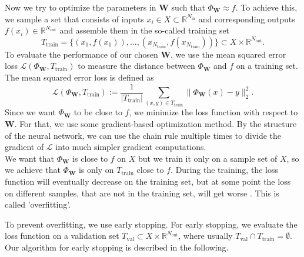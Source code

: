 Now we try to optimize the parameters in $\mathbf{W}$ such that $\Phi_\mathbf{W}\approx f$. To achieve this, we sample a set that consists of inputs $x_i\in X\subset\mathbb{R}^{N_{\mathrm{in}}}$ and corresponding outputs $f(x_i)\in\mathbb{R}^{N_{\mathrm{out}}}$ and assemble them in the so-called training set
\begin{equation}
T_\mathrm{train}=\{(x_1,f(x_1)),\dotsc,(x_{N_\mathrm{train}},f(x_{N_\mathrm{train}}))\}\subset X\times\mathbb{R}^{N_\mathrm{out}}.
\end{equation}
To evaluate the performance of our chosen $\mathbf{W}$, we use the mean squared error loss $\mathscr{L}(\Phi_\mathbf{W},T_\mathrm{train})$ to measure the distance between $\Phi_\mathbf{W}$ and $f$ on a training set. The mean squared error loss is defined as
\begin{displaymath}
\mathscr{L}(\Phi_\mathbf{W},T_\mathrm{train}):=\frac{1}{|T_\mathrm{train}|}\sum_{(x,y)\in T_\mathrm{train}}\| \Phi_\mathbf{W}(x)-y\|_2^2.
\end{displaymath}
Since we want $\Phi_\mathbf{W}$ to be close to $f$, we minimize the loss function with respect to $\mathbf{W}$. For that, we use some gradient-based optimization method. By the structure of the neural network, we can use the chain rule multiple times to divide the gradient of $\mathscr{L}$ into much simpler gradient computations.\\

We want that $\Phi_\mathbf{W}$ is close to $f$ on $X$ but we train it only on a sample set of $X$, so we achieve that $\Phi_\mathbf{W}$ is only on $T_\mathrm{train}$ close to $f$. During the training, the loss function will eventually decrease on the training set, but at some point the loss on different samples, that are not in the training set, will get worse \cite{Prechelt2012}. This is called 'overfitting'.

To prevent overfitting, we use early stopping. For early stopping, we evaluate the loss function on a validation set $T_\mathrm{val}\subset X\times\mathbb{R}^{N_\mathrm{out}}$, where usually $T_\mathrm{val}\cap T_\mathrm{train}=\emptyset$. Our algorithm for early stopping is described in the following.\\

